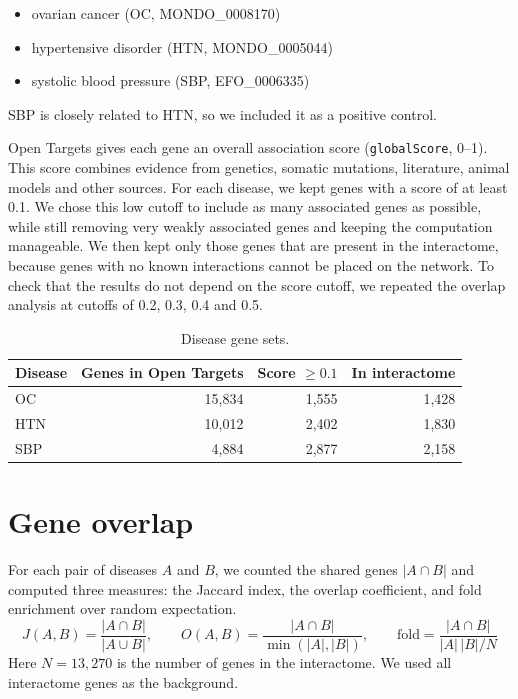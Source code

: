 \documentclass[11pt]{article}
\begin{document}
\begin{itemize}
  \item ovarian cancer (OC, MONDO\_0008170)
  \item hypertensive disorder (HTN, MONDO\_0005044)
  \item systolic blood pressure (SBP, EFO\_0006335)
\end{itemize}

SBP is closely related to HTN, so we included it as a positive control.

Open Targets gives each gene an overall association score (\texttt{globalScore}, 0--1). This score combines evidence from genetics, somatic mutations, literature, animal models and other sources. For each disease, we kept genes with a score of at least 0.1. We chose this low cutoff to include as many associated genes as possible, while still removing very weakly associated genes and keeping the computation manageable. We then kept only those genes that are present in the interactome, because genes with no known interactions cannot be placed on the network. To check that the results do not depend on the score cutoff, we repeated the overlap analysis at cutoffs of 0.2, 0.3, 0.4 and 0.5.

\begin{table}[h]
  \centering
  \begin{tabular}{lrrr}
    \toprule
    Disease & Genes in Open Targets & Score $\ge 0.1$ & In interactome \\
    \midrule
    OC      & 15,834                & 1,555           & 1,428          \\
    HTN     & 10,012                & 2,402           & 1,830          \\
    SBP     & 4,884                 & 2,877           & 2,158          \\
    \bottomrule
  \end{tabular}
  \caption{Disease gene sets.}
\end{table}

\section{Gene overlap}

For each pair of diseases $A$ and $B$, we counted the shared genes $|A \cap B|$ and computed three measures: the Jaccard index, the overlap coefficient, and fold enrichment over random expectation.
\begin{equation}
  J(A,B) = \frac{|A \cap B|}{|A \cup B|}, \qquad
  O(A,B) = \frac{|A \cap B|}{\min(|A|,|B|)}, \qquad
  \text{fold} = \frac{|A \cap B|}{|A|\,|B|/N}
\end{equation}
Here $N = 13{,}270$ is the number of genes in the interactome. We used all interactome genes as the background.
\end{document}

